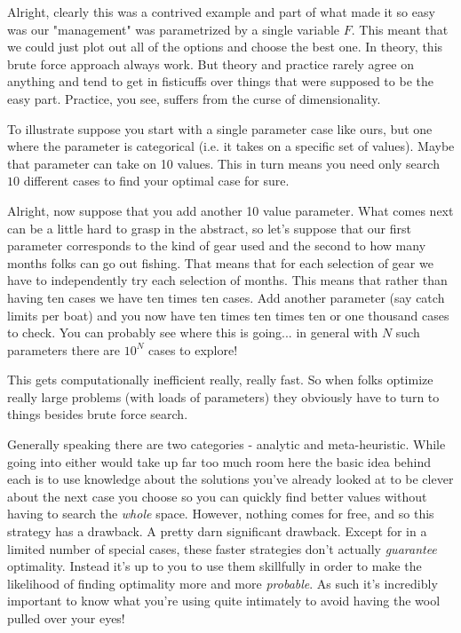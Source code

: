 \documentclass[11pt,a5paper]{book}
\begin{document}
Alright, clearly this was a contrived example and part of what made it so easy was our "management" was parametrized by a single variable $F$. This meant that we could just plot out all of the options and choose the best one. In theory, this brute force approach always work. But theory and practice rarely agree on anything and tend to get in fisticuffs over things that were supposed to be the easy part. Practice, you see, suffers from the curse of dimensionality. 
\newline

To illustrate suppose you start with a single parameter case like ours, but one where the parameter is categorical (i.e. it takes on a specific set of values). Maybe that parameter can take on 10 values. This in turn means you need only search $10$ different cases to find your optimal case for sure. 
\newline

Alright, now suppose that you add another 10 value parameter. What comes next can be a little hard to grasp in the abstract, so let's suppose that our first parameter corresponds to the kind of gear used and the second to how many months folks can go out fishing. That means that for each selection of gear we have to independently try each selection of months. This means that rather than having ten cases we have ten times ten cases. Add another parameter (say catch limits per boat) and you now have ten times ten times ten or one thousand cases to check. You can probably see where this is going... in general with $N$ such parameters there are $10^N$ cases to explore!
\newline

This gets computationally inefficient really, really fast. So when folks optimize really large problems (with loads of parameters) they obviously have to turn to things besides brute force search.
\newline

Generally speaking there are two categories - analytic and meta-heuristic. While going into either would take up far too much room here the basic idea behind each is to use knowledge about the solutions you've already looked at to be clever about the next case you choose so you can quickly find better values without having to search the \textit{whole} space. However, nothing comes for free, and so this strategy has a drawback. A pretty darn significant drawback. Except for in a limited number of special cases, these faster strategies don't actually \textit{guarantee} optimality. Instead it's up to you to use them skillfully in order to make the likelihood of finding optimality more and more \textit{probable}. As such it's incredibly important to know what you're using quite intimately to avoid having the wool pulled over your eyes!
\newpage
\end{document}
